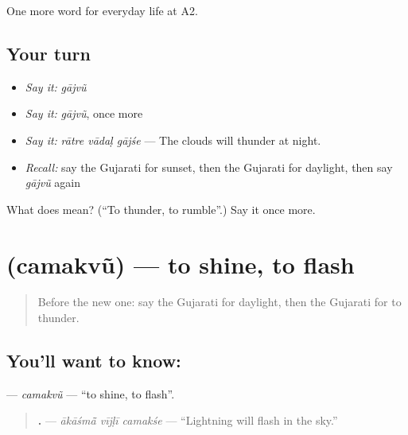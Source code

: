 \begin{grammarlens}[title={What you've built}]
One more word for everyday life at A2.
\end{grammarlens}

\subsection*{Your turn}
\begin{itemize}
\raggedright
  \item \emph{Say it:} \emph{gājvũ}
  \item \emph{Say it:} \emph{gājvũ}, once more
  \item \emph{Say it:} \emph{rātre vādaḷ gājśe} — The clouds will thunder at night.
  \item \emph{Recall:} say the Gujarati for sunset, then the Gujarati for daylight, then say \emph{gājvũ} again
\end{itemize}

\begin{tcolorbox}[breakable,colback=teal!4,colframe=teal!35!black,title={Before you move on}]
What does  mean? (\textquotedblleft{}To thunder, to rumble\textquotedblright{}.) Say it once more.
\end{tcolorbox}
\section[\texorpdfstring{\gu{ચમકવું} (camakvũ)}{ચમકવું (camakvũ)}]{ (camakvũ) — to shine, to flash}

\label{lesson:GU-C219-camakvu}



\begin{quote}
Before the new one: say the Gujarati for daylight, then the Gujarati for to thunder.
\end{quote}

\subsection*{You'll want to know: }
\textbf{} — \emph{camakvũ} — \textquotedblleft{}to shine, to flash\textquotedblright{}.

\begin{quote}
\textbf{  .} — \emph{ākāśmā̃ vījḷī camakśe} — \textquotedblleft{}Lightning will flash in the sky.\textquotedblright{}
\end{quote}

